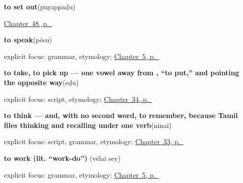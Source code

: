 \noindent\begin{minipage}[t]{\linewidth}
\raggedright
\textbf{to set out}\enspace\emph{}\enspace(puṟappaḍu)\par
\footnotesize \hyperref[ch:ta-setting-out]{Chapter~48, p.~\pageref*{ch:ta-setting-out}}
\end{minipage}\par\smallskip

\noindent\begin{minipage}[t]{\linewidth}
\raggedright
\textbf{to speak}\enspace\emph{}\enspace(pēsu)\par
\footnotesize explicit focus: grammar, etymology; \hyperref[ch:first-verbs]{Chapter~5, p.~\pageref*{ch:first-verbs}}
\end{minipage}\par\smallskip

\noindent\begin{minipage}[t]{\linewidth}
\raggedright
\textbf{to take, to pick up — one vowel away from , \textquotedblleft{}to put,\textquotedblright{} and pointing the opposite way}\enspace\emph{}\enspace(eḍu)\par
\footnotesize explicit focus: script, etymology; \hyperref[ch:ta-verbs-between-people]{Chapter~34, p.~\pageref*{ch:ta-verbs-between-people}}
\end{minipage}\par\smallskip

\noindent\begin{minipage}[t]{\linewidth}
\raggedright
\textbf{to think — and, with no second word, to remember, because Tamil files thinking and recalling under one verb}\enspace\emph{}\enspace(ninai)\par
\footnotesize explicit focus: script, grammar, etymology; \hyperref[ch:ta-verbs-of-the-mind]{Chapter~33, p.~\pageref*{ch:ta-verbs-of-the-mind}}
\end{minipage}\par\smallskip

\noindent\begin{minipage}[t]{\linewidth}
\raggedright
\textbf{to work (lit. \textquotedblleft{}work-do\textquotedblright{})}\enspace\emph{ }\enspace(vēlai sey)\par
\footnotesize explicit focus: grammar, etymology; \hyperref[ch:first-verbs]{Chapter~5, p.~\pageref*{ch:first-verbs}}
\end{minipage}\par\smallskip

